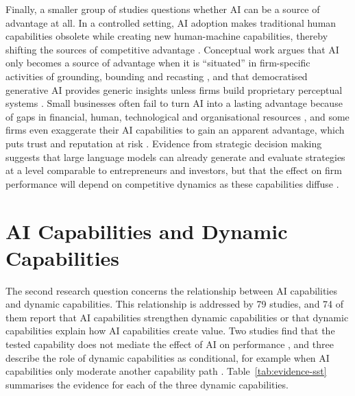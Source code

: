 Finally, a smaller group of studies questions whether AI can be a source of advantage at all. In a controlled setting, AI adoption makes traditional human capabilities obsolete while creating new human-machine capabilities, thereby shifting the sources of competitive advantage . Conceptual work argues that AI only becomes a source of advantage when it is \enquote{situated} in firm-specific activities of grounding, bounding and recasting , and that democratised generative AI provides generic insights unless firms build proprietary perceptual systems . Small businesses often fail to turn AI into a lasting advantage because of gaps in financial, human, technological and organisational resources , and some firms even exaggerate their AI capabilities to gain an apparent advantage, which puts trust and reputation at risk . Evidence from strategic decision making suggests that large language models can already generate and evaluate strategies at a level comparable to entrepreneurs and investors, but that the effect on firm performance will depend on competitive dynamics as these capabilities diffuse .

\section{AI Capabilities and Dynamic Capabilities}
\label{sec:results-ai-dc}

The second research question concerns the relationship between AI capabilities and dynamic capabilities. This relationship is addressed by 79 studies, and 74 of them report that AI capabilities strengthen dynamic capabilities or that dynamic capabilities explain how AI capabilities create value. Two studies find that the tested capability does not mediate the effect of AI on performance , and three describe the role of dynamic capabilities as conditional, for example when AI capabilities only moderate another capability path . Table~\ref{tab:evidence-sst} summarises the evidence for each of the three dynamic capabilities.

